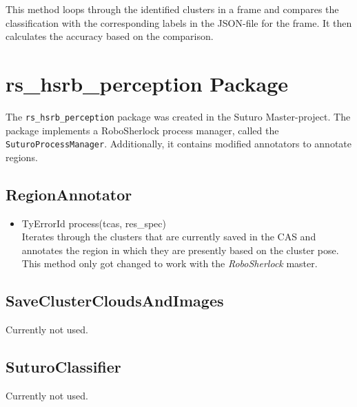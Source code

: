 \documentclass[main.tex]{subfiles}
\begin{document}
This method loops through the identified clusters in a frame and compares the classification with the corresponding labels in the JSON-file for the frame. It then calculates the accuracy based on the comparison.



\section{rs\_hsrb\_perception Package}

The \texttt{rs\_hsrb\_perception} package was created in the Suturo Master-project. The package implements a RoboSherlock process manager, called the \texttt{SuturoProcessManager}. Additionally, it contains modified annotators to annotate regions.

\subsection{RegionAnnotator}
\begin{itemize}
\item TyErrorId process(tcas, res\_spec)\\
Iterates through the clusters that are currently saved in the CAS and annotates the region in which they are presently based on the cluster pose.
This method only got changed to work with the \textit{RoboSherlock} master.
\end{itemize}

\subsection{SaveClusterCloudsAndImages}
Currently not used.

\subsection{SuturoClassifier}
Currently not used.
\end{document}
